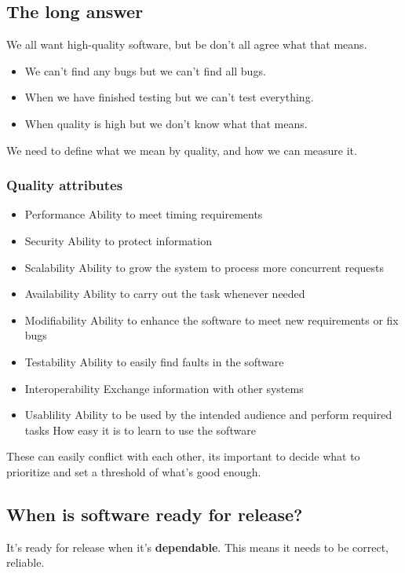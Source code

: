 \subsection{The long answer}
We all want high-quality software, but be don't all agree what that means.\\
\begin{itemize}
	\item We can't find any bugs
	      \subitem but we can't find all bugs.
	\item When we have finished testing
	      \subitem but we can't test everything.
	\item When quality is high
	      \subitem but we don't know what that means.
\end{itemize}
We need to define what we mean by quality, and how we can measure it.\\
\subsubsection{Quality attributes}
\begin{itemize}
	\item Performance
	      \subitem Ability to meet timing requirements
	\item Security
	      \subitem Ability to protect information
	\item Scalability
	      \subitem Ability to grow the system to process more concurrent requests
	\item Availability
	      \subitem Ability to carry out the task whenever needed
	\item Modifiability
	      \subitem Ability to enhance the software to meet new requirements or fix bugs
	\item Testability
	      \subitem Ability to easily find faults in the software
	\item Interoperability
	      \subitem Exchange information with other systems
	\item Usablility
	      \subitem Ability to be used by the intended audience and perform required tasks
	      \subitem How easy it is to learn to use the software
\end{itemize}
These can easily conflict with each other, its important to decide what to prioritize and set a threshold of what's good enough.\\

\subsection{When is software ready for release?}
It's ready for release when it's \textbf{dependable}. This means it needs to be correct, reliable.


